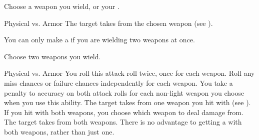         \begin{ability}
            \begin{spelltargetinginfo}
                \spellspecial Choose a weapon you wield, or your .
            \end{spelltargetinginfo}
            \begin{spelleffects}
                \begin{spellattack}{Physical vs. Armor}
                    \spellsuccess The target takes  from the chosen weapon (see ).
                \end{spellattack}
            \end{spelleffects}
        \end{ability}

        \label{Dual Strike}
        You can only make a  if you are wielding two weapons at once.
        \begin{ability}
            \begin{spelltargetinginfo}
                \spellspecial Choose two weapons you wield.
            \end{spelltargetinginfo}
            \begin{spelleffects}
                \begin{spellattack}{Physical vs. Armor}
                    \spellspecial You roll this attack roll twice, once for each weapon.
                    Roll any miss chances or failure chances independently for each weapon.
                    You take a  penalty to accuracy on both attack rolls for each non-light weapon you choose when you use this ability.
                    \spellsuccess The target takes  from one weapon you hit with (see ).
                    If you hit with both weapons, you choose which weapon to deal damage from.
                    \spellcritical The target takes  from both weapons.
                    There is no advantage to getting a  with both weapons, rather than just one.
                \end{spellattack}
            \end{spelleffects}
        \end{ability}

